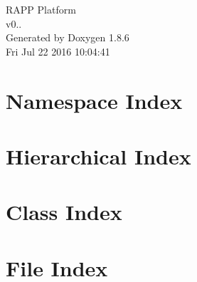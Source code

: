 \documentclass[twoside]{book}
\newcommand{\clearemptydoublepage}{%
  \newpage{\pagestyle{empty}\cleardoublepage}%
}
\begin{document}
\hypersetup{pageanchor=false}
\begin{titlepage}
\vspace*{7cm}
\begin{center}%
{\Large R\-A\-P\-P Platform \\[1ex]\large v0.. }\\
\vspace*{1cm}
{\large Generated by Doxygen 1.8.6}\\
\vspace*{0.5cm}
{\small Fri Jul 22 2016 10:04:41}\\
\end{center}
\end{titlepage}
\clearemptydoublepage
\tableofcontents
\clearemptydoublepage
{}
\hypersetup{pageanchor=true}

\chapter{Namespace Index}

\chapter{Hierarchical Index}

\chapter{Class Index}

\chapter{File Index}

\end{document}
